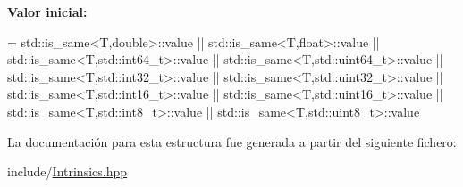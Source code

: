 {\bfseries Valor inicial\+:}
\begin{DoxyCode}
=
    std::is\_same<T,double>::value        ||
    std::is\_same<T,float>::value         ||
    std::is\_same<T,std::int64\_t>::value  ||
    std::is\_same<T,std::uint64\_t>::value ||    
    std::is\_same<T,std::int32\_t>::value  ||
    std::is\_same<T,std::uint32\_t>::value ||
    std::is\_same<T,std::int16\_t>::value  ||
    std::is\_same<T,std::uint16\_t>::value ||
    std::is\_same<T,std::int8\_t>::value   ||
    std::is\_same<T,std::uint8\_t>::value
\end{DoxyCode}


La documentación para esta estructura fue generada a partir del siguiente fichero\+:\begin{DoxyCompactItemize}
\item 
include/\hyperlink{Intrinsics_8hpp}{Intrinsics.\+hpp}\end{DoxyCompactItemize}
